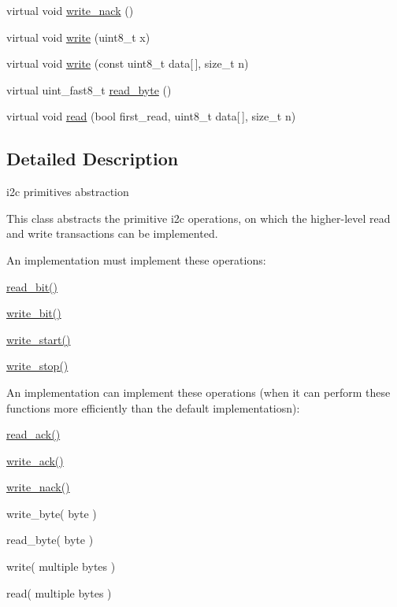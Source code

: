 \begin{DoxyCompactItemize}
\item 
virtual void \mbox{\hyperlink{classhwlib_1_1i2c__primitives_a5ca312553bc0817ffecf5f90caf96396}{write\+\_\+nack}} ()
\item 
virtual void \mbox{\hyperlink{classhwlib_1_1i2c__primitives_aa5227ae39d6dd5957cf47b0b761b475b}{write}} (uint8\+\_\+t x)
\item 
virtual void \mbox{\hyperlink{classhwlib_1_1i2c__primitives_ac1b43fe4971b5df06a0b45f2154e7864}{write}} (const uint8\+\_\+t data\mbox{[}$\,$\mbox{]}, size\+\_\+t n)
\item 
virtual uint\+\_\+fast8\+\_\+t \mbox{\hyperlink{classhwlib_1_1i2c__primitives_a21c9843d3a7801781e576013a1e154f9}{read\+\_\+byte}} ()
\item 
virtual void \mbox{\hyperlink{classhwlib_1_1i2c__primitives_a2a8cc988531ea774d39d726f213f8585}{read}} (bool first\+\_\+read, uint8\+\_\+t data\mbox{[}$\,$\mbox{]}, size\+\_\+t n)
\end{DoxyCompactItemize}


\subsection{Detailed Description}
i2c primitives abstraction

This class abstracts the primitive i2c operations, on which the higher-\/level read and write transactions can be implemented.

An implementation must implement these operations\+:
\begin{DoxyItemize}
\item \mbox{\hyperlink{classhwlib_1_1i2c__primitives_a55a6e105449bcba89fd329a80a065f2c}{read\+\_\+bit()}}
\item \mbox{\hyperlink{classhwlib_1_1i2c__primitives_a959052f7d29732c4371895b29f4e0b64}{write\+\_\+bit()}}
\item \mbox{\hyperlink{classhwlib_1_1i2c__primitives_adc2fc22b39cc81a9871f64325e8e3911}{write\+\_\+start()}}
\item \mbox{\hyperlink{classhwlib_1_1i2c__primitives_a557e3b1319ec01ec0e1f850b24915aa9}{write\+\_\+stop()}}
\end{DoxyItemize}

An implementation can implement these operations (when it can perform these functions more efficiently than the default implementatiosn)\+:
\begin{DoxyItemize}
\item \mbox{\hyperlink{classhwlib_1_1i2c__primitives_adfa6c493163d397f58a3e2ba4617dbac}{read\+\_\+ack()}}
\item \mbox{\hyperlink{classhwlib_1_1i2c__primitives_a711df86e5129b7daeff7a622b7b734c6}{write\+\_\+ack()}}
\item \mbox{\hyperlink{classhwlib_1_1i2c__primitives_a5ca312553bc0817ffecf5f90caf96396}{write\+\_\+nack()}}
\item write\+\_\+byte( byte )
\item read\+\_\+byte( byte )
\item write( multiple bytes )
\item read( multiple bytes )
\end{DoxyItemize}

